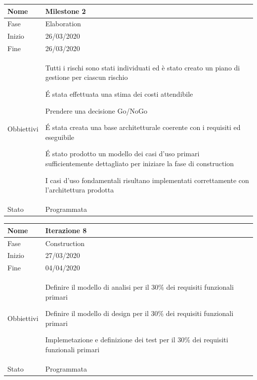 \begin{center}
\begin{tabular}{ |p{2cm}|p{10cm}|  }
\hline
Nome & Milestone 2\\\hline
Fase & Elaboration \\\hline
Inizio & 26/03/2020 \\\hline
Fine &  26/03/2020 \\\hline
Obbiettivi & 
	\begin{compactitem}
		\item Tutti i rischi sono stati individuati ed è stato creato un piano di gestione per ciascun rischio
		\item \'E stata effettuata una stima dei costi attendibile
		\item Prendere una decisione Go/NoGo
		\item \'E stata creata una base architetturale coerente con i requisiti ed eseguibile
		\item \'E stato prodotto un modello dei casi d'uso primari sufficientemente dettagliato per iniziare la fase di construction
		\item I casi d'uso fondamentali risultano implementati correttamente con l'architettura prodotta
	\end{compactitem}\\\hline
Stato &  Programmata \\\hline
\end{tabular}
\label{table:milestone2}\newline

\begin{tabular}{ |p{2cm}|p{10cm}|  }
\hline
Nome & Iterazione 8 \\\hline
Fase & Construction \\\hline
Inizio & 27/03/2020 \\\hline
Fine &  04/04/2020  \\\hline
Obbiettivi & 
	\begin{compactitem}

		\item Definire il modello di analisi per il 30\% dei requisiti funzionali primari
		\item Definire il modello di design per il 30\% dei requisiti funzionali primari
		\item Implemetazione e definizione dei test per il 30\% dei requisiti funzionali primari
	\end{compactitem}\\\hline
Stato &  Programmata \\\hline
\end{tabular}
\label{table:8}\newline


\end{center}
